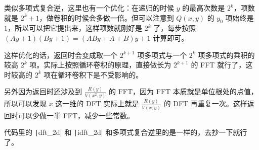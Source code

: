 类似多项式复合逆，这里也有一个优化：在递归的时候 $y$ 的最高次数是 $2^k$，项数就是 $2^k + 1$，做卷积的时候会多做一倍。但可以注意到 $Q(x, y)$ 的 $y_0$ 项始终是 $1$，所以可以把它提出来，这样项数就刚好是 $2^k$ 了，每步按照 $(Ay + 1) (By + 1) = (ABy + A + B) y + 1$ 计算即可。

这样优化的话，返回时会变成取一个 $2^{k + 1}$ 项多项式与一个 $2^k$ 项多项式的乘积的较高 $2^k$ 项。实际上按照循环卷积的原理，直接做长为 $2^{k + 1}$ 的 FFT 就行了，这时较高的 $2^k$ 项在循环卷积下是不受影响的。

另外因为返回时还涉及到 $\frac {R(y)} {V(x ^ 2, y)}$ 的 FFT，因为 FFT 本质就是单位根处的点值，所以可以发现 $x$ 这一维的 DFT 实际上就是 $\frac {R(y)} {V(x, y)}$ 的 DFT 再重复一次。这样返回时可以少做一半 FFT，减少一些常数。

代码里的 \texttt|dft_2d| 和 \texttt|idft_2d| 和多项式复合逆里的是一样的，去抄一下就行了。

\inputminted{cpp}{../src/math/多项式复合.cpp}
